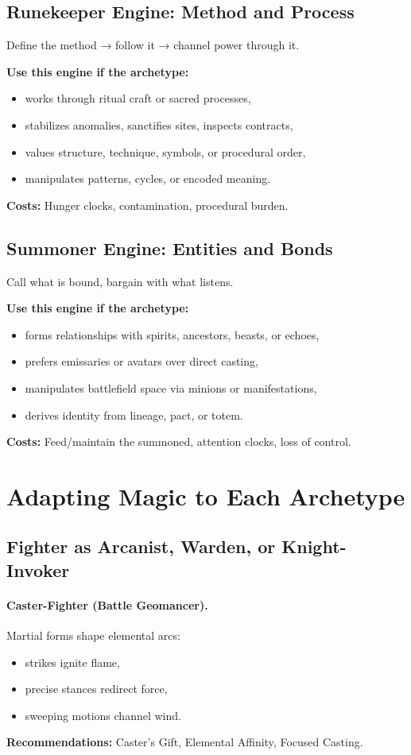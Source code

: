 \documentclass[11pt]{book}
\begin{document}
\subsection{Runekeeper Engine: Method and Process}
Define the method → follow it → channel power through it.

\textbf{Use this engine if the archetype:}
\begin{itemize}
  \item works through ritual craft or sacred processes,
  \item stabilizes anomalies, sanctifies sites, inspects contracts,
  \item values structure, technique, symbols, or procedural order,
  \item manipulates patterns, cycles, or encoded meaning.
\end{itemize}

\textbf{Costs:} Hunger clocks, contamination, procedural burden.

\subsection{Summoner Engine: Entities and Bonds}
Call what is bound, bargain with what listens.

\textbf{Use this engine if the archetype:}
\begin{itemize}
  \item forms relationships with spirits, ancestors, beasts, or echoes,
  \item prefers emissaries or avatars over direct casting,
  \item manipulates battlefield space via minions or manifestations,
  \item derives identity from lineage, pact, or totem.
\end{itemize}

\textbf{Costs:} Feed/maintain the summoned, attention clocks, loss of control.

\section{Adapting Magic to Each Archetype}

\subsection{Fighter as Arcanist, Warden, or Knight-Invoker}
\paragraph{Caster-Fighter (Battle Geomancer).}
Martial forms shape elemental arcs:
\begin{itemize}
  \item strikes ignite flame,
  \item precise stances redirect force,
  \item sweeping motions channel wind.
\end{itemize}
\textbf{Recommendations:} Caster's Gift, Elemental Affinity, Focused Casting.
\end{document}
